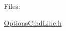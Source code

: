 Files\+:
\begin{DoxyItemize}
\item \mbox{\hyperlink{_options_cmd_line_8h}{Options\+Cmd\+Line.\+h}} 
\end{DoxyItemize}